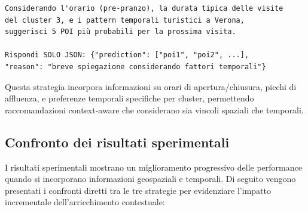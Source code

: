 \begin{enumerate}
\begin{center}
\begin{lstlisting}[language=text, caption=Esempio di Prompt Spatio-temporale, captionpos=b]
Considerando l'orario (pre-pranzo), la durata tipica delle visite 
del cluster 3, e i pattern temporali turistici a Verona, 
suggerisci 5 POI più probabili per la prossima visita.

Rispondi SOLO JSON: {"prediction": ["poi1", "poi2", ...], 
"reason": "breve spiegazione considerando fattori temporali"}
\end{lstlisting}
\end{center}

Questa strategia incorpora informazioni su orari di apertura/chiusura, picchi di affluenza, e preferenze temporali specifiche per cluster, permettendo raccomandazioni context-aware che considerano sia vincoli spaziali che temporali.

\end{enumerate}

\subsection{Confronto dei risultati sperimentali}

I risultati sperimentali mostrano un miglioramento progressivo delle performance quando si incorporano informazioni geospaziali e temporali. Di seguito vengono presentati i confronti diretti tra le tre strategie per evidenziare l'impatto incrementale dell'arricchimento contestuale:

